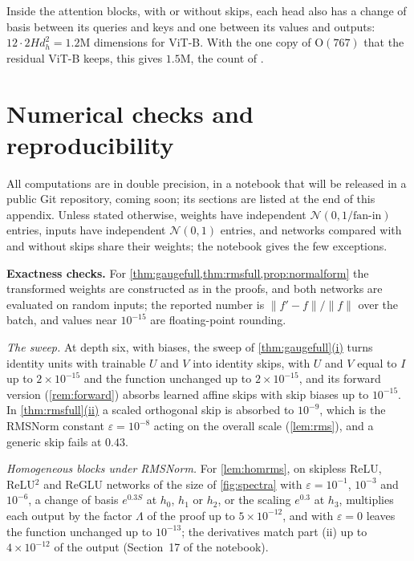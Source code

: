 \documentclass[10pt]{article}
\theoremstyle{definition}
\theoremstyle{remark}
\newcommand{\Ort}{\mathrm{O}}
\newcommand{\norm}[1]{\lVert #1\rVert}
\newcommand{\para}[1]{\smallskip\noindent\textbf{#1}\hspace{0.5em}}
\DeclareRobustCommand{\cpref}[2]{\hyperref[#1:#2]{\cref*{#1}(#2)}}
\begin{document}
Inside the attention blocks, with or without skips, each head also has a change of basis between its queries and keys and one between its values and outputs: $12 \cdot 2Hd_h^2 = 1.2$M dimensions for ViT-B. With the one copy of $\Ort(767)$ that the residual ViT-B keeps, this gives $1.5$M, the count of \citet[Eq.~17]{vannierop2024gauge}.


\FloatBarrier
\section{Numerical checks and reproducibility}\label{app:checks}

All computations are in double precision, in a notebook that will be released in a public Git repository, coming soon; its sections are listed at the end of this appendix. Unless stated otherwise, weights have independent $\mathcal N(0, 1/\text{fan-in})$ entries, inputs have independent $\mathcal N(0, 1)$ entries, and networks compared with and without skips share their weights; the notebook gives the few exceptions.

\para{Exactness checks.} For \cref{thm:gaugefull,thm:rmsfull,prop:normalform} the transformed weights are constructed as in the proofs, and both networks are evaluated on random inputs; the reported number is $\norm{f' - f}/\norm{f}$ over the batch, and values near $10^{-15}$ are floating-point rounding.

\emph{The sweep.} At depth six, with biases, the sweep of \cpref{thm:gaugefull}{i} turns identity units with trainable $U$ and $V$ into identity skips, with $U$ and $V$ equal to $I$ up to $2\times10^{-15}$ and the function unchanged up to $2\times10^{-15}$, and its forward version (\cref{rem:forward}) absorbs learned affine skips with skip biases up to $10^{-15}$. In \cpref{thm:rmsfull}{ii} a scaled orthogonal skip is absorbed to $10^{-9}$, which is the RMSNorm constant $\varepsilon = 10^{-8}$ acting on the overall scale (\cref{lem:rms}), and a generic skip fails at $0.43$.

\emph{Homogeneous blocks under RMSNorm.} For \cref{lem:homrms}, on skipless ReLU, ReLU$^2$ and ReGLU networks of the size of \cref{fig:spectra} with $\varepsilon = 10^{-1}$, $10^{-3}$ and $10^{-6}$, a change of basis $e^{0.3S}$ at $h_0$, $h_1$ or $h_2$, or the scaling $e^{0.3}$ at $h_3$, multiplies each output by the factor $\Lambda$ of the proof up to $5\times10^{-12}$, and with $\varepsilon = 0$ leaves the function unchanged up to $10^{-13}$; the derivatives match part (ii) up to $4\times10^{-12}$ of the output (Section~17 of the notebook).
\end{document}
